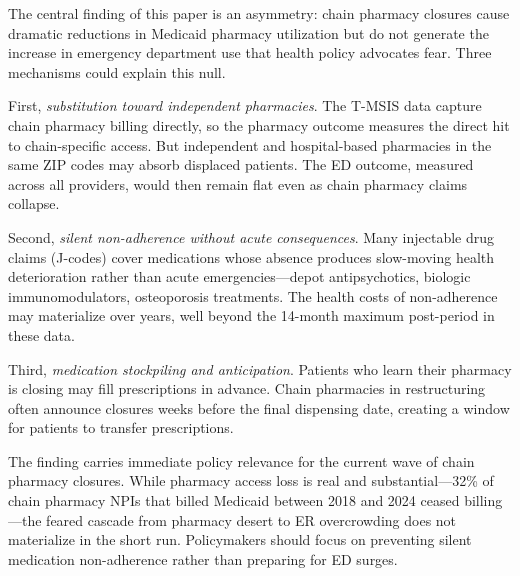 \documentclass[12pt]{article}
\begin{document}
The central finding of this paper is an asymmetry: chain pharmacy closures cause dramatic reductions in Medicaid pharmacy utilization but do not generate the increase in emergency department use that health policy advocates fear. Three mechanisms could explain this null.

First, \textit{substitution toward independent pharmacies}. The T-MSIS data capture chain pharmacy billing directly, so the pharmacy outcome measures the direct hit to chain-specific access. But independent and hospital-based pharmacies in the same ZIP codes may absorb displaced patients. The ED outcome, measured across all providers, would then remain flat even as chain pharmacy claims collapse.

Second, \textit{silent non-adherence without acute consequences}. Many injectable drug claims (J-codes) cover medications whose absence produces slow-moving health deterioration rather than acute emergencies---depot antipsychotics, biologic immunomodulators, osteoporosis treatments. The health costs of non-adherence may materialize over years, well beyond the 14-month maximum post-period in these data.

Third, \textit{medication stockpiling and anticipation}. Patients who learn their pharmacy is closing may fill prescriptions in advance. Chain pharmacies in restructuring often announce closures weeks before the final dispensing date, creating a window for patients to transfer prescriptions.

The finding carries immediate policy relevance for the current wave of chain pharmacy closures. While pharmacy access loss is real and substantial---32\% of chain pharmacy NPIs that billed Medicaid between 2018 and 2024 ceased billing---the feared cascade from pharmacy desert to ER overcrowding does not materialize in the short run. Policymakers should focus on preventing silent medication non-adherence rather than preparing for ED surges.
\end{document}
